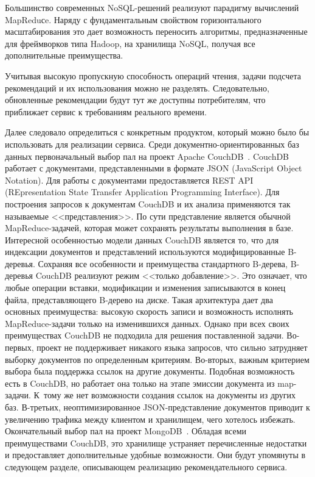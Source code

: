 \begin{multicols}{2}
   Большинство современных NoSQL-ре\-ше\-ний ре\-а\-ли\-зу\-ют парадигму 
вычислений MapReduсe. Наря\-ду с фундаментальным свойством 
горизон\-таль\-но\-го масштабирования это дает \mbox{возможность} переносить 
алгоритмы, предназначенные для фреймворков типа Hadoop, на хранилища 
NoSQL, получая все дополнительные преимущества.
   
   Учитывая высокую пропускную способность операций чтения, задачи 
подсчета рекомендаций и их использования можно не разделять. 
Следовательно, обновленные рекомендации будут тут же доступны 
потребителям, что приближает сервис к требованиям реального времени.
   
   Далее следовало определиться с конкретным продуктом, который можно 
было бы использовать для реализации сервиса. Среди 
   до\-ку\-мент\-но-ориен\-ти\-ро\-ван\-ных баз данных первоначальный выбор 
пал на проект Apache CouchDB~\cite{8-kli}. CouchDB работает с документами, 
представленными в формате JSON (JavaScript Object Notation). Для работы с документами предоставляется 
REST API (REpresentation State Transfer Application Programming Interface). 
Для построения запросов к документам CouchDB и их анализа 
применяются так называемые <<представления>>. По сути представление 
является обычной MapReduce-за\-да\-чей, которая может сохранять результаты 
выполнения в базе. Интересной особенностью модели данных CouchDB 
является то, что для индексации документов и представлений используются 
модифицированные B-де\-ревья. Сохраняя все особенности и преимущества 
стандартного B-де\-ре\-ва, B-де\-ревья CouchDB реализуют режим <<только 
добавление>>. Это означает, что любые операции вставки, модификации и 
изменения записываются в конец файла, представляющего B-де\-ре\-во на 
диске. Такая архитектура дает два основных преимущества: высокую ско\-рость 
записи и возможность исполнять MapReduce-за\-да\-чи только на 
изменившихся данных. Однако при всех своих преимуществах CouchDB не 
подходила для решения поставленной задачи. Во-пер\-вых, проект не 
поддерживает никакого языка запросов, что сильно затрудняет выборку 
документов по определенным критериям. Во-вто\-рых, важным критерием 
выбора была поддержка ссылок на другие документы. Подобная возможность 
есть в CouchDB, но работает она только на этапе эмиссии документа из 
   map-за\-да\-чи. К~тому же нет возможности создания ссылок на документы 
из других баз. В-третьих, неоптимизированное JSON-представление 
документов приводит к увеличению трафика между клиентом и хранилищем, 
чего хотелось избежать.
 Окончательный выбор пал на проект MongoDB~\cite{9-kli}. Обладая всеми 
преимуществами CouchDB, это хранилище устраняет перечисленные 
недостатки и предоставляет дополнительные удобные возможности. Они будут 
упомянуты в следующем разделе, опи\-сы\-ва\-ющем реализацию 
рекомендательного сервиса.


\end{multicols}
